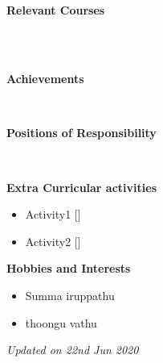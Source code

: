 \documentclass[a4paper,10pt]{article}
\begin{document}



\colorbox{titleColor}{\parbox{6.7in}{\textbf{Relevant Courses}}}\\[0.08in]
\begin{tabular}{p{3.5in}p{3in}p{2.5in}}

\end{tabular}

\colorbox{titleColor}{\parbox{6.7in}{\textbf{Achievements}}}\\[0.08in]
\begin{itemize}
  \setlength{\itemsep}{1pt}

\end{itemize}

\colorbox{titleColor}{\parbox{6.7in}{\textbf{Positions of Responsibility}}}\\


\colorbox{titleColor}{\parbox{6.7in}{\textbf{Extra Curricular activities}}}
\begin{itemize}
  \setlength{\itemsep}{1pt}
\item Activity1 \hfill {\small{{[]}}\/}
\item Activity2 \hfill {\small{{[]}}\/}

\end{itemize}

\colorbox{titleColor}{\parbox{6.7in}{\textbf{Hobbies and Interests}}}
\begin{itemize}
  \setlength{\itemsep}{1pt}
\item Summa iruppathu
\item thoongu vathu

\end{itemize}

\textit{Updated on 22nd Jun 2020}
\end{document}
